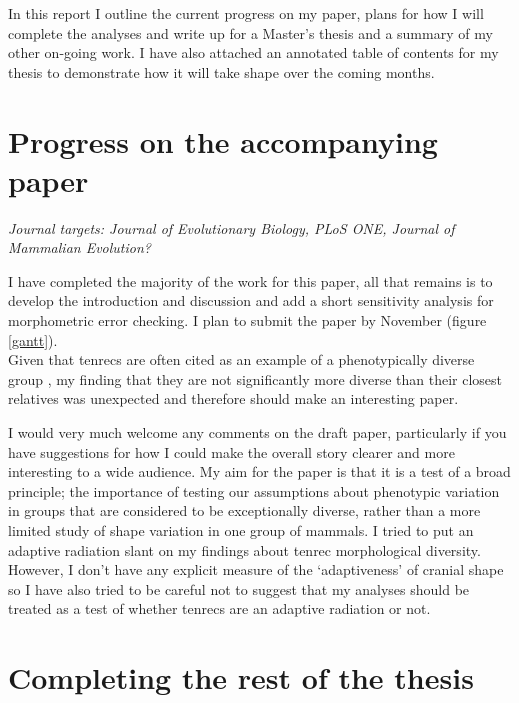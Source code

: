 \documentclass[12pt,a4paper]{article}
\begin{document}
	In this report I outline the current progress on my paper, plans for how I will complete the analyses and write up for a Master's thesis and a summary of my other on-going work. I have also attached an annotated table of contents for my thesis to demonstrate how it will take shape over the coming months.   


\section{Progress on the accompanying paper}

	\textit{Journal targets: Journal of Evolutionary Biology, PLoS ONE, Journal of Mammalian Evolution?} 
\bigskip

	I have completed the majority of the work for this paper, all that remains is to develop the introduction and discussion and add a short sensitivity analysis for morphometric error checking. I plan to submit the paper by November (figure \ref{gantt}). \\
	Given that tenrecs are often cited as an example of a phenotypically diverse group \citep[e.g.][]{Olson2013}, my finding that they are not significantly more diverse than their closest relatives was unexpected and therefore should make an interesting paper.

	I would very much welcome any comments on the draft paper, particularly if you have suggestions for how I could make the overall story clearer and more interesting to a wide audience. My aim for the paper is that it is a test of a broad principle; the importance of testing our assumptions about phenotypic variation in groups that are considered to be exceptionally diverse, rather than a more limited study of shape variation in one group of mammals. I tried to put an adaptive radiation slant on my findings about tenrec morphological diversity. However, I don't have any explicit measure of the `adaptiveness' of cranial shape so I have also tried to be careful not to suggest that my analyses should be treated as a test of whether tenrecs are an adaptive radiation or not.




\section{Completing the rest of the thesis} %
\end{document}
